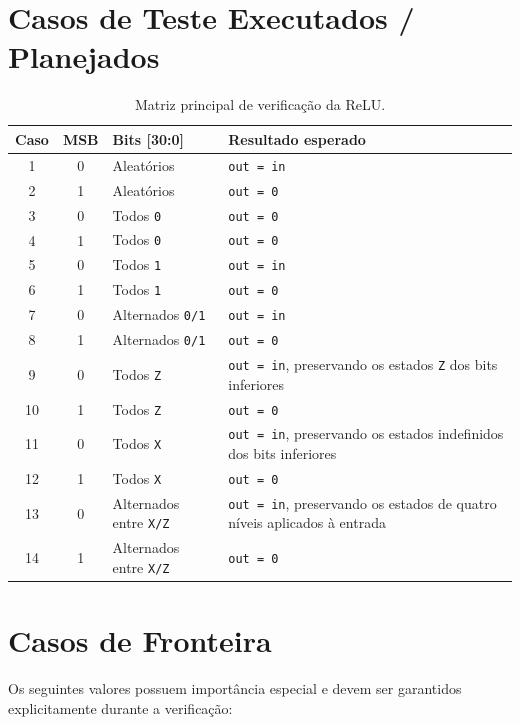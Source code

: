 \documentclass[12pt,a4paper]{article}
\begin{document}
\section{Casos de Teste Executados / Planejados}
\begin{table}[H]
\centering
\scriptsize
\begin{tabularx}{\textwidth}{|c|c|p{4.0cm}|X|}
\hline
\textbf{Caso} & \textbf{MSB} & \textbf{Bits [30:0]} & \textbf{Resultado esperado} \\ \hline
1  & 0 & Aleatórios                  & \texttt{out = in} \\ \hline
2  & 1 & Aleatórios                  & \texttt{out = 0} \\ \hline
3  & 0 & Todos \texttt{0}            & \texttt{out = 0} \\ \hline
4  & 1 & Todos \texttt{0}            & \texttt{out = 0} \\ \hline
5  & 0 & Todos \texttt{1}            & \texttt{out = in} \\ \hline
6  & 1 & Todos \texttt{1}            & \texttt{out = 0} \\ \hline
7  & 0 & Alternados \texttt{0/1}     & \texttt{out = in} \\ \hline
8  & 1 & Alternados \texttt{0/1}     & \texttt{out = 0} \\ \hline
9  & 0 & Todos \texttt{Z}            & \texttt{out = in}, preservando os estados \texttt{Z} dos bits inferiores \\ \hline
10 & 1 & Todos \texttt{Z}            & \texttt{out = 0} \\ \hline
11 & 0 & Todos \texttt{X}            & \texttt{out = in}, preservando os estados indefinidos dos bits inferiores \\ \hline
12 & 1 & Todos \texttt{X}            & \texttt{out = 0} \\ \hline
13 & 0 & Alternados entre \texttt{X/Z} & \texttt{out = in}, preservando os estados de quatro níveis aplicados à entrada \\ \hline
14 & 1 & Alternados entre \texttt{X/Z} & \texttt{out = 0} \\ \hline
\end{tabularx}
\caption{Matriz principal de verificação da ReLU.}
\end{table}

\section{Casos de Fronteira}
Os seguintes valores possuem importância especial e devem ser garantidos explicitamente durante a verificação:
\end{document}
